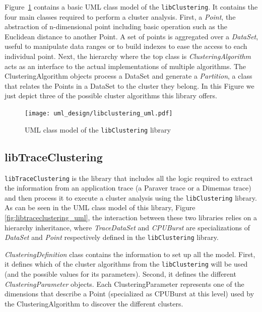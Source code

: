 \documentclass[a4paper, 12pt]{article}
\begin{document}
Figure~\ref{fig:libclustering_uml} contains a basic UML class model of 
the \texttt{libClustering}. It contains the four main classes required to
perform a cluster analysis. First, a \textit{Point}, the abstraction of 
n-dimensional point including basic operation such as the Euclidean distance
to another Point. A set of points is aggregated over a \textit{DataSet},
useful to manipulate data ranges or to build indexes to ease the access
to each individual point. Next, the hierarchy where the top class is
\textit{ClusteringAlgorithm} acts as an interface to the actual
implementations of multiple algorithms. The ClusteringAlgorithm objects
process a DataSet and generate a \textit{Partition}, a class that relates 
the Points in a DataSet to the cluster they belong. In this Figure we just
depict three of the possible cluster algorithms this library offers.

\begin{figure}
  \centering
  \texttt{[image: uml\_design/libclustering\_uml.pdf]}
  \caption{UML class model of the \texttt{libClustering} library}
  \label{fig:libclustering_uml}
\end{figure}


\subsection{libTrace\-Clustering}

\texttt{libTrace\-Clustering} is the library that includes all the logic
required to extract the information from an application trace (a Paraver
trace or a Dimemas trace) and then process it to execute a cluster analysis
using the \texttt{libClustering} library. As can be seen in the UML
class model of this library, Figure \ref{fig:libtraceclustering_uml}, the
interaction between these two libraries relies on a hierarchy inheritance,
where \textit{TraceDataSet} and \textit{CPUBurst} are specializations
of \textit{DataSet} and \textit{Point} respectively defined in the
\texttt{libClustering} library.

\textit{ClusteringDefinition} class contains the information to set up all
the model. First, it defines which of the cluster algorithms from the
\texttt{libClustering} will be used (and the possible values for its
parameters). Second, it defines the different \textit{ClusteringParameter}
objects. Each ClusteringParameter represents one of the dimensions that 
describe a Point (specialized as CPUBurst at this level) used by the 
ClusteringAlgorithm to discover the different clusters.
\end{document}
